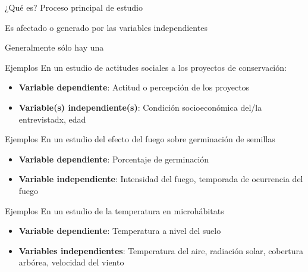 \documentclass[
  11pt,
  ignorenonframetext,
]{beamer}
\begin{document}
\begin{frame}{¿Qué es?}
\protect\hypertarget{quuxe9-es}{}
Proceso principal de estudio

Es afectado o generado por las variables independientes

Generalmente sólo hay una
\end{frame}

\begin{frame}{Ejemplos}
\protect\hypertarget{ejemplos}{}
En un estudio de actitudes sociales a los proyectos de conservación:

\begin{itemize}
\item
  \textbf{Variable dependiente}: Actitud o percepción de los proyectos
\item
  \textbf{Variable(s) independiente(s)}: Condición socioeconómica del/la
  entrevistadx, edad
\end{itemize}
\end{frame}

\begin{frame}{Ejemplos}
\protect\hypertarget{ejemplos-1}{}
En un estudio del efecto del fuego sobre germinación de semillas

\begin{itemize}
\item
  \textbf{Variable dependiente}: Porcentaje de germinación
\item
  \textbf{Variable independiente}: Intensidad del fuego, temporada de
  ocurrencia del fuego
\end{itemize}
\end{frame}

\begin{frame}{Ejemplos}
\protect\hypertarget{ejemplos-2}{}
En un estudio de la temperatura en microhábitats

\begin{itemize}
\item
  \textbf{Variable dependiente}: Temperatura a nivel del suelo
\item
  \textbf{Variables independientes}: Temperatura del aire, radiación
  solar, cobertura arbórea, velocidad del viento
\end{itemize}
\end{frame}
\end{document}
